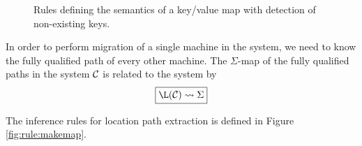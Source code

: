 \begin{figure}[!h]
\caption{Rules defining the semantics of a key/value map with detection of
non-existing keys.}\label{fig:rule:sigma}
\end{figure}

In order to perform migration of a single machine in the system, we need to
know the fully qualified path of every other machine. The $\Sigma$-map of the
fully qualified paths in the system $\mathcal{C}$ is related to the system by
\begin{equation*}
\boxed{\L(\C) \leadsto \Sigma}
\end{equation*}

The inference rules for location path extraction is defined in Figure
\ref{fig:rule:makemap}.


